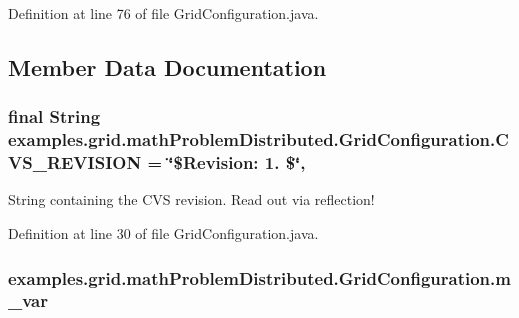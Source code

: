 Definition at line 76 of file Grid\-Configuration.\-java.



\subsection{Member Data Documentation}
\hypertarget{classexamples_1_1grid_1_1math_problem_distributed_1_1_grid_configuration_a16a71751c47a8f936c2fa5ed34bd39fe}{
\subsubsection[{C\-V\-S\-\_\-\-R\-E\-V\-I\-S\-I\-O\-N}]{\setlength{\rightskip}{0pt plus 5cm}final String examples.\-grid.\-math\-Problem\-Distributed.\-Grid\-Configuration.\-C\-V\-S\-\_\-\-R\-E\-V\-I\-S\-I\-O\-N = \char`\"{}\$Revision\-: 1. \$\char`\"{}\hspace{0.3cm}{\ttfamily [static]}, {\ttfamily [private]}}}\label{classexamples_1_1grid_1_1math_problem_distributed_1_1_grid_configuration_a16a71751c47a8f936c2fa5ed34bd39fe}
String containing the C\-V\-S revision. Read out via reflection! 

Definition at line 30 of file Grid\-Configuration.\-java.

\hypertarget{classexamples_1_1grid_1_1math_problem_distributed_1_1_grid_configuration_a39c3e288aea96cc4e7cc2747e8e4ab7f}{
\subsubsection[{m\-\_\-var}]{ examples.\-grid.\-math\-Problem\-Distributed.\-Grid\-Configuration.\-m\-\_\-var\hspace{0.3cm}{\ttfamily [private]}}}\label{classexamples_1_1grid_1_1math_problem_distributed_1_1_grid_configuration_a39c3e288aea96cc4e7cc2747e8e4ab7f}


